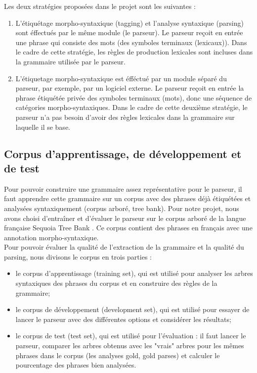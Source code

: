 \documentclass[12pt]{article}
\begin{document}
Les deux strat\'egies propos\'ees dans le projet sont les suivantes :
\begin{enumerate}
  \item L'\'etiqu\'etage morpho-syntaxique (tagging) et l'analyse syntaxique
  (parsing) sont \'effectu\'es par le m\^eme module (le parseur). Le
  parseur reçoit en entr\'ee une phrase qui consiste des mots (des symboles terminaux (lexicaux)).
  Dans le cadre de cette strat\'egie, les r\`egles de production lexicales sont
  incluses dans la grammaire utilis\'ee par le parseur.
  \item L'\'etiquetage morpho-syntaxique est \'eff\'ectu\'e par un module s\'epar\'e du
  parseur, par exemple, par un logiciel externe. Le parseur reçoit en entr\'ee la
  phrase \'etiqu\'et\'ee priv\'ee des symboles terminaux (mots), donc une s\'equence de
  cat\'egories morpho-syntaxiques. Dans le cadre de cette deuxi\`eme strat\'egie, le
  parseur n'a pas besoin d'avoir des r\`egles lexicales dans la grammaire sur
  laquelle il se base.
\end{enumerate}

\subsection{Corpus d'apprentissage, de d\'eveloppement et de test}

Pour pouvoir construire une grammaire assez repr\'esentative pour le parseur, il
faut apprendre cette grammaire sur un corpus avec des phrases d\'ej\`a \'etiqu\'et\'ees et
analys\'ees syntaxiquement (corpus arbor\'e, tree bank). Pour notre projet, nous
avons choisi d'entra\^iner et d'\'evaluer le parseur sur le corpus arbor\'e de la
langue française Sequoia Tree Bank \cite{Sequoia}. Ce corpus contient des
phrases en français avec une annotation morpho-syntaxique.\\

Pour pouvoir \'evaluer la qualit\'e de l'extraction de la grammaire et la qualit\'e du
parsing, nous divisons le corpus en trois parties :
\begin{itemize}
  \item le corpus d'apprentissage (training set), qui est utilis\'e pour analyser
  les arbres syntaxiques des phrases du corpus et en construire des r\`egles de la
  grammaire;
  \item le corpus de d\'eveloppement (development set), qui est utilis\'e pour
  essayer de lancer le parseur avec des diff\'erentes options et consid\'erer les
  r\'esultats;
  \item le corpus de test (test set), qui est utilis\'e pour l'\'evaluation :
  il faut lancer le parseur, comparer les arbres obtenus avec les "vrais" arbres
  pour les m\^emes phrases dans le corpus (les analyses gold, gold parses) et
  calculer le pourcentage des phrases bien analys\'ees.
\end{itemize}
\end{document}
